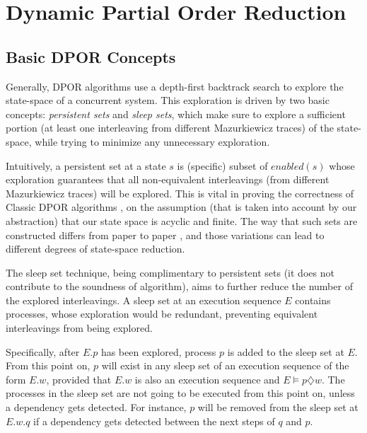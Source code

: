 \chapter{Dynamic Partial Order Reduction}
\label{dpor}

\section{Basic DPOR Concepts}

Generally, DPOR algorithms use a depth-first backtrack search to explore the state-space of a concurrent system.
This exploration is driven by two basic concepts: \textit{persistent sets} and \textit{sleep sets}, which make sure to explore a
sufficient portion (at least one interleaving from different Mazurkiewicz traces) of the state-space,
while trying to minimize any unnecessary exploration.

Intuitively, a persistent set at a state $s$ is (specific) subset of $enabled(s)$ whose exploration guarantees that all
non-equivalent interleavings (from different Mazurkiewicz traces) will be explored. This is vital in proving the correctness of Classic 
DPOR algorithms \cite{FlanaganDPOR}, on the assumption 
(that is taken into account by our abstraction) that our state space is acyclic and finite.
The way that such sets are constructed differs from paper to paper \cite{FlanaganDPOR, Lei:2006:RTC:1248722.1248743, 10.1007/3-540-53863-1_36},
and those variations can lead to different degrees of state-space reduction.

The sleep set technique, being complimentary to persistent sets (it does not contribute to the soundness of algorithm),
aims to further reduce the number of the explored interleavings.
A sleep set at an execution sequence $E$ contains processes, whose exploration would be redundant,
preventing equivalent interleavings from being explored.

Specifically, after $E.p$ has been explored, process $p$ is added to the sleep set
at $E$. From this point on, $p$ will exist in any sleep set of an execution sequence
of the form $E.w$, provided that $E.w$ is also an execution sequence and $E\models p \diamondsuit w$. 
The processes in the sleep set are not going to be executed from this point on, unless a dependency gets detected. 
For instance, $p$ will be removed from the sleep set at $E.w.q$ if a dependency gets detected between the
next steps of $q$ and $p$. 

